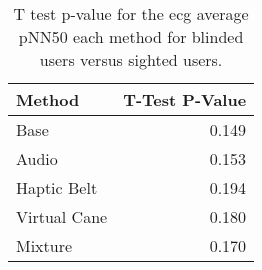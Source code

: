 
\begin{table}[!htb]
\centering
\caption{T test p-value for the ecg average pNN50 each method for blinded users versus sighted users.}
\label{tab:ttest_ecg_pnn50}
\begin{tabular}{lr}
\toprule
      Method &  T-Test P-Value \\
\midrule
        Base &           0.149 \\
       Audio &           0.153 \\
 Haptic Belt &           0.194 \\
Virtual Cane &           0.180 \\
     Mixture &           0.170 \\
\bottomrule
\end{tabular}
\end{table}

